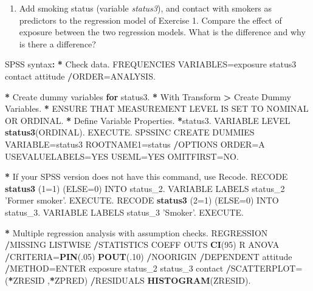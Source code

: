 \documentclass[a4paper]{book}
\newenvironment{Shaded}{\begin{snugshade}}{\end{snugshade}}
\newcommand{\KeywordTok}[1]{\textcolor[rgb]{0,0,0}{\textbf{#1}}}
\newcommand{\DataTypeTok}[1]{\textcolor[rgb]{0,0,0}{#1}}
\newcommand{\DecValTok}[1]{\textcolor[rgb]{0.00,0.00,0.00}{#1}}
\newcommand{\StringTok}[1]{\textcolor[rgb]{0.00,0.00,0.00}{#1}}
\newcommand{\ControlFlowTok}[1]{\textcolor[rgb]{0.00,0.00,0.00}{\textbf{#1}}}
\newcommand{\OperatorTok}[1]{\textcolor[rgb]{0.00,0.00,0.00}{\textbf{#1}}}
\newcommand{\ErrorTok}[1]{\textcolor[rgb]{0.00,0.00,0.00}{\textbf{#1}}}
\newcommand{\NormalTok}[1]{#1}
\providecommand{\tightlist}{%
  \setlength{\itemsep}{0pt}\setlength{\parskip}{0pt}}
\theoremstyle{definition}
\theoremstyle{definition}
\theoremstyle{definition}
\theoremstyle{remark}
\begin{document}
\begin{enumerate}
\def\labelenumi{\arabic{enumi}.}
\setcounter{enumi}{1}
\tightlist
\item
  Add smoking status (variable \emph{status3}), and contact with smokers
  as predictors to the regression model of Exercise 1. Compare the
  effect of exposure between the two regression models. What is the
  difference and why is there a difference?
\end{enumerate}

\begin{Shaded}
\begin{Highlighting}[]
\NormalTok{SPSS syntax}\OperatorTok{:}\StringTok{  }
\StringTok{  }
\ErrorTok{*}\StringTok{ }\NormalTok{Check data.  }
\NormalTok{FREQUENCIES VARIABLES=exposure status3 contact attitude  }
  \OperatorTok{/}\NormalTok{ORDER=ANALYSIS.  }

\OperatorTok{*}\StringTok{ }\NormalTok{Create dummy variables }\ControlFlowTok{for}\NormalTok{ status3.  }
\OperatorTok{*}\StringTok{ }\NormalTok{With Transform }\OperatorTok{>}\StringTok{ }\NormalTok{Create Dummy Variables. }
\OperatorTok{*}\StringTok{ }\NormalTok{ENSURE THAT MEASUREMENT LEVEL IS SET TO NOMINAL OR ORDINAL.  }
\OperatorTok{*}\StringTok{ }\NormalTok{Define Variable Properties.  }
\OperatorTok{*}\NormalTok{status3.  }
\NormalTok{VARIABLE LEVEL  }\KeywordTok{status3}\NormalTok{(ORDINAL).  }
\NormalTok{EXECUTE.  }
\NormalTok{SPSSINC CREATE DUMMIES VARIABLE=status3   }
\NormalTok{ROOTNAME1=status   }
\OperatorTok{/}\NormalTok{OPTIONS ORDER=A USEVALUELABELS=YES USEML=YES OMITFIRST=NO.  }

\OperatorTok{*}\StringTok{ }\NormalTok{If your SPSS version does not have this command, use Recode.}
\NormalTok{RECODE }\KeywordTok{status3}\NormalTok{ (}\DecValTok{1}\NormalTok{=}\DecValTok{1}\NormalTok{) (}\DataTypeTok{ELSE=}\DecValTok{0}\NormalTok{) INTO status_}\DecValTok{2}\NormalTok{.}
\NormalTok{VARIABLE LABELS  status_}\DecValTok{2} \StringTok{'Former smoker'}\NormalTok{.}
\NormalTok{EXECUTE.}
\NormalTok{RECODE }\KeywordTok{status3}\NormalTok{ (}\DecValTok{2}\NormalTok{=}\DecValTok{1}\NormalTok{) (}\DataTypeTok{ELSE=}\DecValTok{0}\NormalTok{) INTO status_}\DecValTok{3}\NormalTok{.}
\NormalTok{VARIABLE LABELS  status_}\DecValTok{3} \StringTok{'Smoker'}\NormalTok{.}
\NormalTok{EXECUTE.}

\OperatorTok{*}\StringTok{ }\NormalTok{Multiple regression analysis with assumption checks.  }
\NormalTok{REGRESSION  }
  \OperatorTok{/}\NormalTok{MISSING LISTWISE  }
  \OperatorTok{/}\NormalTok{STATISTICS COEFF OUTS }\KeywordTok{CI}\NormalTok{(}\DecValTok{95}\NormalTok{) R ANOVA  }
  \OperatorTok{/}\NormalTok{CRITERIA=}\KeywordTok{PIN}\NormalTok{(.}\DecValTok{05}\NormalTok{) }\KeywordTok{POUT}\NormalTok{(.}\DecValTok{10}\NormalTok{)  }
  \OperatorTok{/}\NormalTok{NOORIGIN   }
  \OperatorTok{/}\NormalTok{DEPENDENT attitude  }
  \OperatorTok{/}\NormalTok{METHOD=ENTER exposure status_}\DecValTok{2}\NormalTok{ status_}\DecValTok{3}\NormalTok{ contact  }
  \OperatorTok{/}\NormalTok{SCATTERPLOT=(}\OperatorTok{*}\NormalTok{ZRESID ,}\OperatorTok{*}\NormalTok{ZPRED)  }
  \OperatorTok{/}\NormalTok{RESIDUALS }\KeywordTok{HISTOGRAM}\NormalTok{(ZRESID).  }
  

\end{Highlighting}
\end{Shaded}
\end{document}
